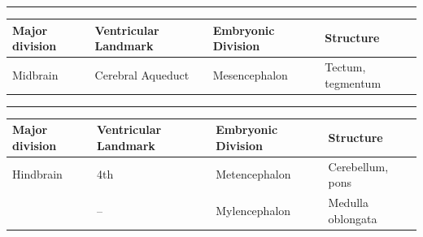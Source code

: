 \documentclass[
  letterpaper,
  DIV=11,
  numbers=noendperiod]{scrartcl}
\begin{document}
\begin{center}\rule{0.5\linewidth}{0.5pt}\end{center}

\begin{longtable}[]{@{}
  >{\raggedright\arraybackslash}p{}
  >{\raggedright\arraybackslash}p{}
  >{\raggedright\arraybackslash}p{}
  >{\raggedright\arraybackslash}p{}@{}}
\toprule\noalign{}
\begin{minipage}[b]{\linewidth}\raggedright
Major division
\end{minipage} & \begin{minipage}[b]{\linewidth}\raggedright
Ventricular Landmark
\end{minipage} & \begin{minipage}[b]{\linewidth}\raggedright
Embryonic Division
\end{minipage} & \begin{minipage}[b]{\linewidth}\raggedright
Structure
\end{minipage} \\
\midrule\noalign{}
\endhead
\bottomrule\noalign{}
\endlastfoot
Midbrain & Cerebral Aqueduct & Mesencephalon & Tectum, tegmentum \\
\end{longtable}

\begin{center}\rule{0.5\linewidth}{0.5pt}\end{center}

\begin{longtable}[]{@{}
  >{\raggedright\arraybackslash}p{}
  >{\raggedright\arraybackslash}p{}
  >{\raggedright\arraybackslash}p{}
  >{\raggedright\arraybackslash}p{}@{}}
\toprule\noalign{}
\begin{minipage}[b]{\linewidth}\raggedright
Major division
\end{minipage} & \begin{minipage}[b]{\linewidth}\raggedright
Ventricular Landmark
\end{minipage} & \begin{minipage}[b]{\linewidth}\raggedright
Embryonic Division
\end{minipage} & \begin{minipage}[b]{\linewidth}\raggedright
Structure
\end{minipage} \\
\midrule\noalign{}
\endhead
\bottomrule\noalign{}
\endlastfoot
Hindbrain & 4th & Metencephalon & Cerebellum, pons \\
& -- & Mylencephalon & Medulla oblongata \\
\end{longtable}
\end{document}
